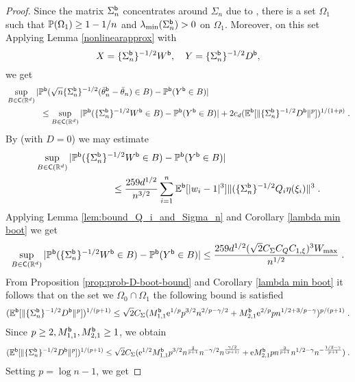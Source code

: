 \begin{proof}
Since the matrix $\Sigma_n^{\mathsf{b}}$ concentrates around $\Sigma_n$ due to  , there is a set $\Omega_1$ such that $\mathbb{P}(\Omega_1) \geq 1-1/n$ and  $\lambda_{\min}(\Sigma_n^{\mathsf{b}}) > 0$ on $\Omega_1$. Moreover, on this set 
    Applying Lemma \ref{nonlinearapprox} with 
    $$
    X = \{\Sigma_n^{\mathsf{b}}\}^{-1/2} W^{\mathsf{b}}, \quad Y = \{\Sigma_n^{\mathsf{b}}\}^{-1/2} D^{\mathsf{b}},
    $$
    we get
    \begin{equation}
\begin{split}
    &\sup_{B \in \mathsf{C}(\mathbb{R}^d)}|\mathbb{P}^{\mathsf{b}}( \sqrt n  \{\Sigma_n^{\mathsf{b}}\}^{-1/2} (\bar{\theta}_{n}^{\mathsf{b}} - \bar{\theta}_n) \in B) - \mathbb{P}^{\mathsf{b}}(Y^{\mathsf{b}} \in B)| \\
    & \qquad\qquad\le \sup_{B \in \mathsf{C}(\mathbb{R}^d)}|\mathbb{P}^{\mathsf{b}}(\{\Sigma_n^{\mathsf{b}}\}^{-1/2} W^{\mathsf{b}} \in B) - \mathbb{P}^{\mathsf{b}}(Y^{\mathsf{b}} \in B)|  + 2 c_d (\mathbb{E}^{\mathsf{b}}[\|\{\Sigma_n^{\mathsf{b}}\}^{-1/2} D^{\mathsf{b}}\|^p])^{1/(1+p)} \;. 
    \end{split}
\end{equation}
By \citep{shao2022berry} (with $D = 0$) we may estimate 
\begin{equation}
    \label{CLT boot lin stat proof}
    \begin{split}
    &\sup_{B \in \mathsf{C}(\mathbb{R}^d)}|\mathbb{P}^{\mathsf{b}}(\{\Sigma_n^{\mathsf{b}}\}^{-1/2} W^{\mathsf{b}} \in B) - \mathbb{P}^{\mathsf{b}}(Y^{\mathsf{b}} \in B)| \\
    &\qquad\qquad\qquad\qquad\le \frac{259 d^{1/2}}{n^{3/2}} \sum_{i = 1}^n \mathbb{E}^{\mathsf{b}}[|w_i-1|^3] \| (\{\Sigma_n^{\mathsf{b}}\}^{-1/2} Q_i 
    \eta(\xi_i)\|^3 \;.
    \end{split}
\end{equation}
Applying Lemma \ref{lem:bound_Q_i_and_Sigma_n} and Corollary \ref{lambda min boot} we get 
\begin{equation}
    \label{CLT boot lin stat proof 2}
    \sup_{B \in \mathsf{C}(\mathbb{R}^d)}|\mathbb{P}^{\mathsf{b}}(\{\Sigma_n^{\mathsf{b}}\}^{-1/2} W^{\mathsf{b}} \in B) - \mathbb{P}^{\mathsf{b}}(Y^{\mathsf{b}} \in B)| \le \frac{259 d^{1/2} (\sqrt{2} C_\Sigma  C_Q C_{1, \xi})^3 W_{\max}}{n^{1/2}} \;.
\end{equation}
From Proposition \ref{prop:prob-D-boot-bound} and Corollary \ref{lambda min boot} it follows that on the set we $\Omega_0 \cap \Omega_1$ the following bound is satisfied 
\begin{equation}
(\mathbb{E}^{\mathsf{b}}[\|\{\Sigma_n^{\mathsf{b}}\}^{-1/2} D^{\mathsf{b}}\|^p])^{1/(p+1)} \leq \sqrt{2}C_{\Sigma}(M_{1,1}^{\mathsf{b}}\mathrm{e}^{1/p}p^{3/2}n^{2/p-\gamma/2} +  M_{2,1}^{\mathsf{b}}\mathrm{e}^{2/p}p n^{1/2+3/p-\gamma})^{p/(p+1)} \;.
\end{equation}
Since $p\geq 2, M_{1,1}^{\mathsf{b}}, M_{2,1}^{\mathsf{b}} \geq 1$, we obtain 
\begin{equation}
    (\mathbb{E}^{\mathsf{b}}[\|\{\Sigma_n^{\mathsf{b}}\}^{-1/2} D^{\mathsf{b}}\|^p])^{1/(p+1)} \leq 
    \sqrt{2} C_{\Sigma}(\mathrm{e}^{1/2} M_{1,1}^{\mathsf{b}}p^{3/2} n^{\frac{2}{p+1}}n^{-\gamma/2}n^{\frac{\gamma/2}{(p+1)}} +  \mathrm{e} M_{2,1}^{\mathsf{b}} p n^{\frac{3}{p+1}}n^{1/2-\gamma}n^{-\frac{1/2-\gamma}{p+1}}) \;.
\end{equation}
Setting $p = \log n - 1$, we get 


\end{proof}
